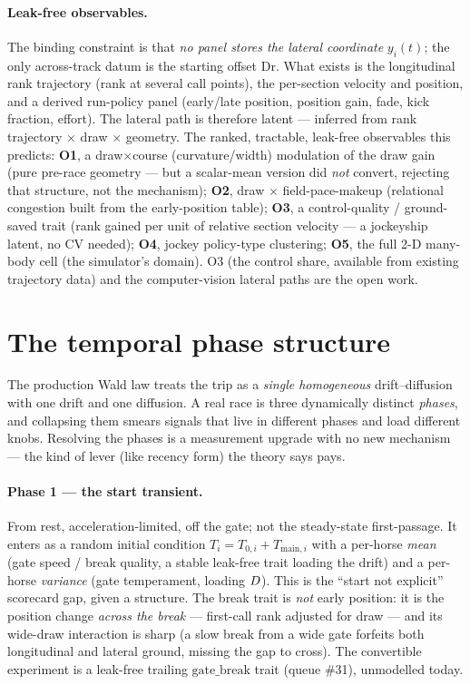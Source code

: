 \paragraph{Leak-free observables.} The binding constraint is that \emph{no panel stores the lateral
coordinate} $y_i(t)$; the only across-track datum is the starting offset $\mathrm{Dr}$. What exists
is the longitudinal rank trajectory (rank at several call points), the per-section velocity and
position, and a derived run-policy panel (early/late position, position gain, fade, kick fraction,
effort). The lateral path is therefore latent --- inferred from rank trajectory $\times$ draw
$\times$ geometry. The ranked, tractable, leak-free observables this predicts: \textbf{O1}, a
draw$\times$course (curvature/width) modulation of the draw gain (pure pre-race geometry --- but a
scalar-mean version did \emph{not} convert, rejecting that structure, not the mechanism);
\textbf{O2}, draw $\times$ field-pace-makeup (relational congestion built from the early-position
table); \textbf{O3}, a control-quality / ground-saved trait (rank gained per unit of relative
section velocity --- a jockeyship latent, no CV needed); \textbf{O4}, jockey policy-type clustering;
\textbf{O5}, the full 2-D many-body cell (the simulator's domain). O3 (the control share, available
from existing trajectory data) and the computer-vision lateral paths are the open work.

\section{The temporal phase structure}
\label{sec:phases}

The production Wald law treats the trip as a \emph{single homogeneous} drift--diffusion with one
drift and one diffusion. A real race is three dynamically distinct \emph{phases}, and collapsing
them smears signals that live in different phases and load different knobs. Resolving the phases is a
measurement upgrade with no new mechanism --- the kind of lever (like recency form) the theory says
pays.

\paragraph{Phase 1 --- the start transient.} From rest, acceleration-limited, off the gate; not the
steady-state first-passage. It enters as a random initial condition $T_i = T_{0,i} + T_{\text{main},i}$
with a per-horse \emph{mean} (gate speed / break quality, a stable leak-free trait loading the drift)
and a per-horse \emph{variance} (gate temperament, loading $D$). This is the ``start not
explicit'' scorecard gap, given a structure. The break trait is \emph{not} early position: it is the
position change \emph{across the break} --- first-call rank adjusted for draw --- and its
wide-draw interaction is sharp (a slow break from a wide gate forfeits both longitudinal and lateral
ground, missing the gap to cross). The convertible experiment is a leak-free trailing
$\mathrm{gate\_break}$ trait (queue \#31), unmodelled today.

